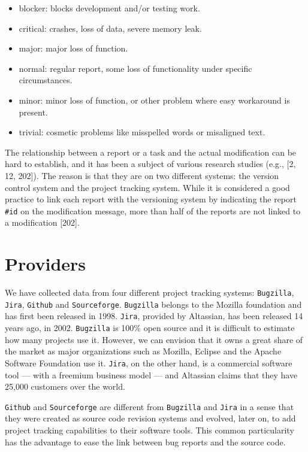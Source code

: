 \documentclass[12pt]{report}
\providecommand{\tightlist}{%
  \setlength{\itemsep}{0pt}\setlength{\parskip}{0pt}}
\begin{document}
\begin{itemize}
\tightlist
\item
  blocker: blocks development and/or testing work.
\item
  critical: crashes, loss of data, severe memory leak.
\item
  major: major loss of function.
\item
  normal: regular report, some loss of functionality under specific
  circumstances.
\item
  minor: minor loss of function, or other problem where easy workaround
  is present.
\item
  trivial: cosmetic problems like misspelled words or misaligned text.
\end{itemize}

The relationship between a report or a task and the actual modification
can be hard to establish, and it has been a subject of various research
studies (e.g., {[}2, 12, 202{]}). The reason is that they are on two
different systems: the version control system and the project tracking
system. While it is considered a good practice to link each report with
the versioning system by indicating the report \lstinline!#id! on the
modification message, more than half of the reports are not linked to a
modification {[}202{]}.

\section{\texorpdfstring{Providers\label{sec:bug-provider}}{Providers}}\label{providers-1}

We have collected data from four different project tracking systems:
\lstinline!Bugzilla!, \lstinline!Jira!, \lstinline!Github! and
\lstinline!Sourceforge!. \lstinline!Bugzilla! belongs to the Mozilla
foundation and has first been released in 1998. \lstinline!Jira!,
provided by Altassian, has been released 14 years ago, in 2002.
\lstinline!Bugzilla! is 100\% open source and it is difficult to
estimate how many projects use it. However, we can envision that it owns
a great share of the market as major organizations such as Mozilla,
Eclipse and the Apache Software Foundation use it. \lstinline!Jira!, on
the other hand, is a commercial software tool --- with a freemium
business model --- and Altassian claims that they have 25,000 customers
over the world.

\lstinline!Github! and \lstinline!Sourceforge! are different from
\lstinline!Bugzilla! and \lstinline!Jira! in a sense that they were
created as source code revision systems and evolved, later on, to add
project tracking capabilities to their software tools. This common
particularity has the advantage to ease the link between bug reports and
the source code.
\end{document}
